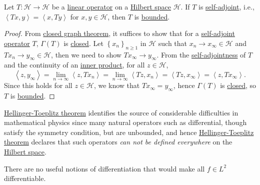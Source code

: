 \begin{theorem}\label{thm:Hellinger-Toeplitz}
	Let \(T\colon \mathcal{H} \to \mathcal{H} \) be a \hyperref[def:linear-op]{linear operator} on a \hyperref[def:Hilbert-space]{Hilbert space} \(\mathcal{H} \). If \(T\) is \hyperref[def:self-adjoint-op]{self-adjoint}, i.e., \(\left\langle Tx, y \right\rangle  = \left\langle x, Ty \right\rangle\) for \(x, y\in \mathcal{H} \), then \(T\) is \hyperref[rmk:bounded-op]{bounded}.
\end{theorem}
\begin{proof}
	From \hyperref[thm:closed-graph]{closed graph theorem}, it suffices to show that for a \hyperref[def:self-adjoint-op]{self-adjoint operator} \(T\), \(\Gamma (T)\) is \hyperref[def:closed-graph]{closed}. Let \(\left\{ x_n \right\} _{n\geq 1}\) in \(\mathcal{H} \) such that \(x_n \to x_\infty \in \mathcal{H} \) and \(Tx_n \to y_\infty \in\mathcal{H} \), then we need to show \(Tx_\infty \to y_\infty \). From the \hyperref[def:self-adjoint-op]{self-adjointness} of \(T\) and the continuity of an \hyperref[def:inner-product]{inner product}, for all \(z\in \mathcal{H} \),
	\[
		\left\langle z, y_\infty  \right\rangle = \lim\limits_{n \to \infty} \left\langle z, Tx_n \right\rangle = \lim\limits_{n \to \infty} \left\langle Tz, x_n \right\rangle = \left\langle Tz, x_\infty  \right\rangle = \left\langle z, Tx_\infty  \right\rangle.
	\]
	Since this holds for all \(z\in \mathcal{H} \), we know that \(Tx_\infty = y_\infty \), hence \(\Gamma (T)\) is \hyperref[def:closed-graph]{closed}, so \(T\) is \hyperref[rmk:bounded-op]{bounded}.
\end{proof}

\hyperref[thm:Hellinger-Toeplitz]{Hellinger-Toeplitz theorem} identifies the source of considerable difficulties in mathematical physics since many natural operators such as differential, though satisfy the symmetry condition, but are unbounded, and hence \hyperref[thm:Hellinger-Toeplitz]{Hellinger-Toeplitz theorem} declares that such operators \emph{can not be defined everywhere} on the \hyperref[def:Hilbert-space]{Hilbert space}.

\begin{eg}
	There are no useful notions of differentiation that would make all \(f\in L^2\) differentiable.
\end{eg}